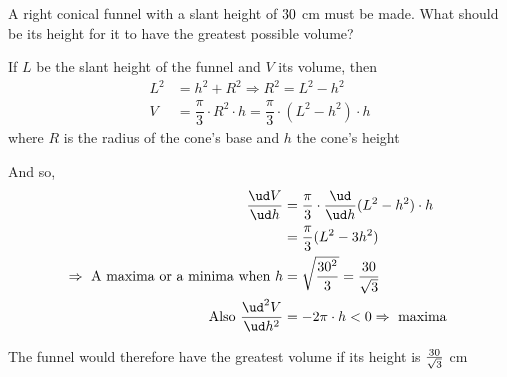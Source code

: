 


\question[3] A right conical funnel with a slant height of $30$ cm must be made. What should 
be its height for it to have the greatest possible volume?

\watchout

\ifprintanswers
\fi 

\begin{solution}[\halfpage]
   If $L$ be the slant height of the funnel and $V$ its volume, then 
   \begin{align}
       L^2 &= h^2 + R^2 \Rightarrow R^2 = L^2 - h^2 \\ 
       V &= \dfrac{\pi}{3}\cdot R^2\cdot h = \dfrac{\pi}{3}\cdot(L^2 - h^2)\cdot h
   \end{align}
   where $R$ is the radius of the cone's base and $h$ the cone's height
   
   And so, 
   \begin{align}
      \dfrac{\ud V}{\ud h} &= \dfrac{\pi}{3}\cdot\dfrac{\ud}{\ud h}(L^2-h^2)\cdot h \\
             &= \dfrac{\pi}{3}(L^2 - 3h^2) \\
      \Rightarrow\text{ A maxima or a minima when } h &= \sqrt{\dfrac{\vbone^2}{3}} = \dfrac{\vbone}{\sqrt{3}} \\
      \text{Also }\dfrac{\ud^2 V}{\ud h^2} &= -2\pi\cdot h < 0 \Rightarrow \text{ maxima }
   \end{align}
   
   The funnel would therefore have the greatest volume if its height is $\frac{30}{\sqrt{3}}$ cm
   
\end{solution}
